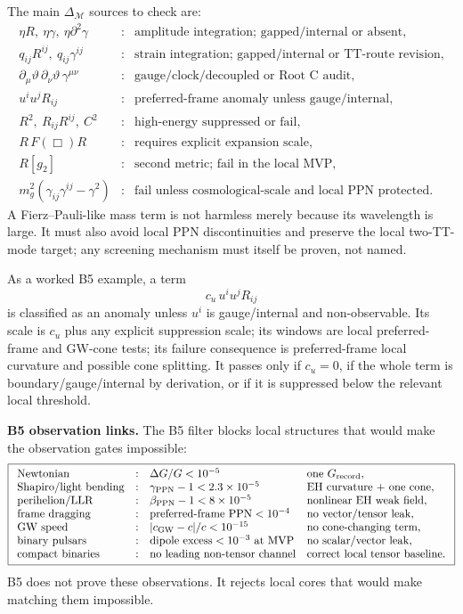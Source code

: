\documentclass[11pt]{article}
\begin{document}
The main \(\Delta_{\mathcal M}\) sources to check are:
\[
\boxed{
\begin{array}{lll}
\eta R,\ \eta\gamma,\ \eta\partial^2\gamma
&:& \text{amplitude integration; gapped/internal or absent},\\
q_{ij}R^{ij},\ q_{ij}\gamma^{ij}
&:& \text{strain integration; gapped/internal or TT-route revision},\\
\partial_\mu\vartheta\,\partial_\nu\vartheta\,\gamma^{\mu\nu}
&:& \text{gauge/clock/decoupled or Root C audit},\\
u^iu^jR_{ij} &:& \text{preferred-frame anomaly unless gauge/internal},\\
R^2,\ R_{ij}R^{ij},\ C^2
&:& \text{high-energy suppressed or fail},\\
R\,F(\Box)R &:& \text{requires explicit expansion scale},\\
R[g_2] &:& \text{second metric; fail in the local MVP},\\
m_g^2(\gamma_{ij}\gamma^{ij}-\gamma^2)
&:& \text{fail unless cosmological-scale and local PPN protected}.
\end{array}}
\]
A Fierz--Pauli-like mass term is not harmless merely because its wavelength is
large.  It must also avoid local PPN discontinuities and preserve the local
two-TT-mode target; any screening mechanism must itself be proven, not named.

As a worked B5 example, a term
\[
\boxed{c_u\,u^iu^jR_{ij}}
\]
is classified as an anomaly unless \(u^i\) is gauge/internal and
non-observable.  Its scale is \(c_u\) plus any explicit suppression scale; its
windows are local preferred-frame and GW-cone tests; its failure consequence
is preferred-frame local curvature and possible cone splitting.  It passes
only if \(c_u=0\), if the whole term is boundary/gauge/internal by derivation,
or if it is suppressed below the relevant local threshold.

\medskip\noindent\textbf{B5 observation links.}
The B5 filter blocks local structures that would make the observation gates
impossible:
\[
\boxed{
\begin{array}{llll}
\text{Newtonian} &:& \Delta G/G<10^{-5}
& \text{one }G_{\rm record},\\
\text{Shapiro/light bending} &:& \gamma_{\rm PPN}-1<2.3\times10^{-5}
& \text{EH curvature + one cone},\\
\text{perihelion/LLR} &:& \beta_{\rm PPN}-1<8\times10^{-5}
& \text{nonlinear EH weak field},\\
\text{frame dragging} &:& \text{preferred-frame PPN}<10^{-4}
& \text{no vector/tensor leak},\\
\text{GW speed} &:& |c_{\rm GW}-c|/c<10^{-15}
& \text{no cone-changing term},\\
\text{binary pulsars} &:& \text{dipole excess}<10^{-3}\ \text{at MVP}
& \text{no scalar/vector leak},\\
\text{compact binaries} &:& \text{no leading non-tensor channel}
& \text{correct local tensor baseline}.
\end{array}}
\]
B5 does not prove these observations.  It rejects local cores that would make
matching them impossible.
\end{document}
